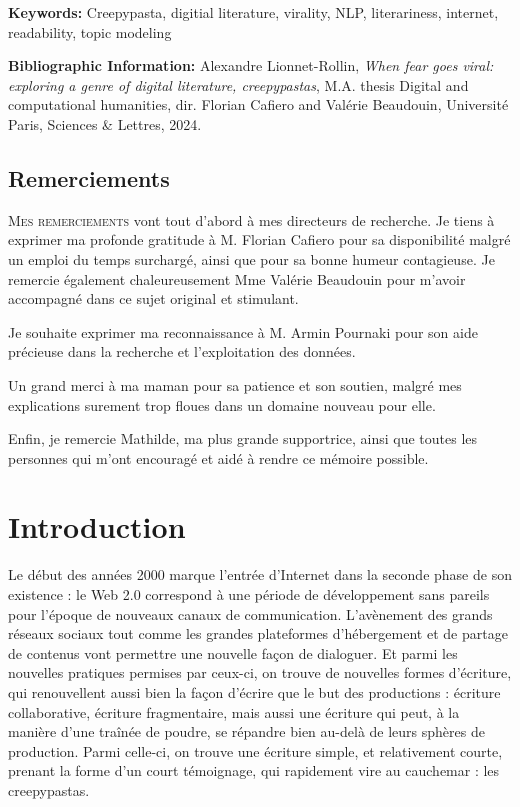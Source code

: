 \documentclass[12pt,a4paper,oneside,titlepage]{book} %
\begin{document}
\medskip

\textbf{Keywords:} Creepypasta, digitial literature, virality, NLP, literariness, internet, readability, topic modeling

\textbf{Bibliographic Information:} Alexandre Lionnet-Rollin, \textit{When fear goes viral: exploring a genre of digital literature, creepypastas}, M.A. thesis \og Digital and computational humanities\fg{}, dir. Florian Cafiero and Valérie Beaudouin, Université Paris, Sciences \& Lettres, 2024.


\clearpage
\thispagestyle{empty}
\cleardoublepage


\section*{Remerciements}

\lettrine{M}{es remerciements} vont tout d'abord à mes directeurs de recherche. Je tiens à exprimer ma profonde gratitude à M. Florian Cafiero pour sa disponibilité malgré un emploi du temps surchargé, ainsi que pour sa bonne humeur contagieuse. Je remercie également chaleureusement Mme Valérie Beaudouin pour m'avoir accompagné dans ce sujet original et stimulant.

Je souhaite exprimer ma reconnaissance à M. Armin Pournaki pour son aide précieuse dans la recherche et l'exploitation des données. 

Un grand merci à ma maman pour sa patience et son soutien, malgré mes explications surement trop floues dans un domaine nouveau pour elle.

Enfin, je remercie Mathilde, ma plus grande supportrice, ainsi que toutes les personnes qui m'ont encouragé et aidé à rendre ce mémoire possible.

\clearpage

\thispagestyle{empty}
\cleardoublepage

\tableofcontents
\newpage
\listoffigures
\listoftables
\newpage
{}
\chapter*{Introduction}

Le début des années 2000 marque l’entrée d’Internet dans la seconde phase de son existence : le Web 2.0 correspond à une période de développement sans pareils pour l’époque de nouveaux canaux de communication. L’avènement des grands réseaux sociaux tout comme les grandes plateformes d’hébergement et de partage de contenus vont permettre une nouvelle façon de dialoguer. Et parmi les nouvelles pratiques permises par ceux-ci, on trouve de nouvelles formes d'écriture, qui renouvellent aussi bien la façon d’écrire que le but des productions : écriture collaborative, écriture fragmentaire, mais aussi une écriture qui peut, à la manière d'une traînée de poudre, se répandre bien au-delà de leurs sphères de production. Parmi celle-ci, on trouve une écriture simple, et relativement courte, prenant la forme d'un court témoignage, qui rapidement vire au cauchemar : les creepypastas. 
\end{document}
